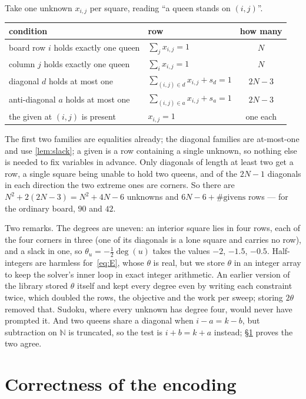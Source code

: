 \documentclass{easychair}
\newcommand{\secref}[1]{\hyperref[#1]{\textcolor{academicpurple}{\S\ref*{#1}}}}
\begin{document}
Take one unknown $x_{i,j}$ per square, reading \enquote{a queen stands on $(i,j)$}.

\begin{center}\small
\begin{tabular}{@{}llc@{}}
\toprule
condition & row & how many\\
\midrule
board row $i$ holds exactly one queen & $\sum_j x_{i,j}=1$ & $N$\\
column $j$ holds exactly one queen & $\sum_i x_{i,j}=1$ & $N$\\
diagonal $d$ holds at most one & $\sum_{(i,j)\in d}x_{i,j}+s_d=1$ & $2N-3$\\
anti-diagonal $a$ holds at most one & $\sum_{(i,j)\in a}x_{i,j}+s_a=1$ & $2N-3$\\
the given at $(i,j)$ is present & $x_{i,j}=1$ & one each\\
\bottomrule
\end{tabular}
\end{center}

The first two families are equalities already; the diagonal families are at-most-one and use
\cref{lem:slack}; a given is a row containing a single unknown, so nothing else is needed to fix
variables in advance. Only diagonals of length at least two get a row, a single square being unable
to hold two queens, and of the $2N-1$ diagonals in each direction the two extreme ones are corners.
So there are $N^2 + 2(2N-3) = N^2+4N-6$ unknowns and $6N-6+\#\text{givens}$ rows --- for the ordinary
board, $90$ and $42$.

Two remarks. The degrees are uneven: an interior square lies in four rows, each of the four corners in
three (one of its diagonals is a lone square and carries no row), and a slack in one, so
$\theta_u = -\tfrac12\deg(u)$ takes the values $-2$, $-1.5$, $-0.5$. Half-integers are harmless
for~\eqref{eq:E}, whose $\theta$ is real, but we store $\theta$ in an integer array to keep the
solver's inner loop in exact integer arithmetic. An earlier version of the library stored $\theta$
itself and kept every degree even by writing each constraint twice, which doubled the rows, the
objective and the work per sweep; storing $2\theta$ removed that. Sudoku, where every unknown has
degree four, would never have prompted it. And two queens share a diagonal when $i - a = k - b$, but
subtraction on $\mathbb{N}$ is truncated, so the test is $i + b = k + a$ instead;
\secref{sec:correct} proves the two agree.

\section{Correctness of the encoding}\label{sec:correct}
\end{document}
